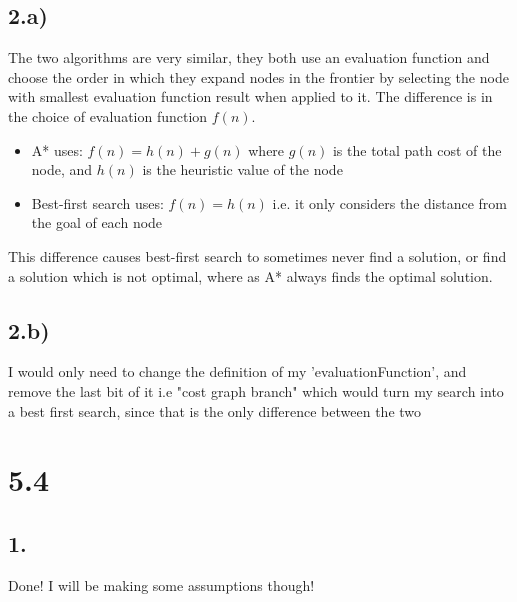 \documentclass{report}
\begin{document}
\subsection*{2.a)}
The two algorithms are very similar, they both use an evaluation function and choose the order in which they expand nodes in the frontier by selecting the node with smallest evaluation function result when applied to it. The difference is in the choice of evaluation function $f(n)$.
\begin{itemize}
    \item A* uses: $f(n) = h(n) + g(n)$ where $g(n)$ is the total path cost of the node, and $h(n)$ is the heuristic value of the node
    \item Best-first search uses: $f(n) = h(n)$ i.e. it only considers the distance from the goal of each node 
\end{itemize}
This difference causes best-first search to sometimes never find a solution, or find a solution which is not optimal, where as A* always finds the optimal solution. 
\subsection*{2.b)}
I would only need to change the definition of my 'evaluationFunction', and remove the last bit of it i.e "cost graph branch" which would turn my search into a best first search, since that is the only difference between the two
\section*{5.4}
\subsection*{1.}
Done! I will be making some assumptions though!
\end{document}
